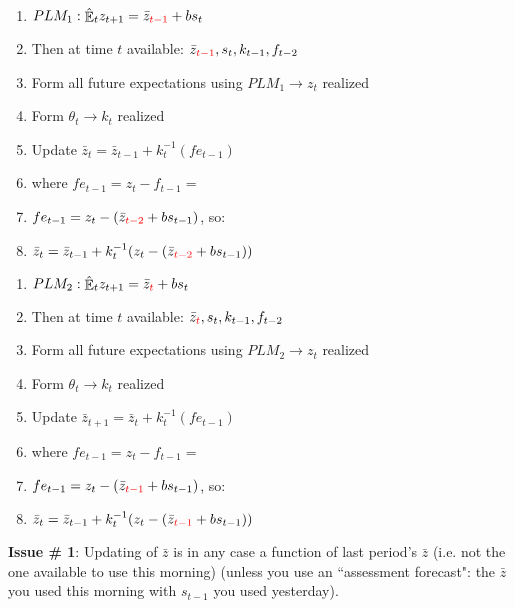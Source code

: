 \documentclass[11pt]{article}
\renewcommand{\[}{\begin{equation}}
\renewcommand{\]}{\end{equation}}
\DeclareMathOperator{\E}{\mathbb{E}}
\begin{document}
\begin{multicols}{2}

\begin{enumerate}
\item[] $PLM_1: \hat{\E}_t z_{t+1} = \bar{z}_{\color{red}{t-1}} + bs_t$
\item[] Then at time $t$ available: $\bar{z}_{\color{red}{t-1}}, s_t, k_{t-1}, f_{t-2}$
\item Form all future expectations using $PLM_1 \rightarrow z_t$ realized 
\item Form $\theta_t \rightarrow k_t$ realized
\item Update $\bar{z}_t = \bar{z}_{t-1} + k_t^{-1}(fe_{t-1})$
\item[] where $fe_{t-1} = z_{t}-f_{t-1} = $ 
\item[] $fe_{t-1} = z_{t}-(\bar{z}_{\color{red}{t-2}} + bs_{t-1})$, so:
\item[] $\bar{z}_t = \bar{z}_{t-1} + k_t^{-1}(z_{t}-(\bar{z}_{\color{red}{t-2}} + bs_{t-1}))$
\end{enumerate}

\columnbreak
\begin{enumerate}
\item[] $PLM_2: \hat{\E}_t z_{t+1} = \bar{z}_{\color{red}{t}} + bs_t$
\item[] Then at time $t$ available: $\bar{z}_{\color{red}{t}}, s_t, k_{t-1}, f_{t-2}$
\item Form all future expectations using $PLM_2 \rightarrow z_t$ realized
\item Form $\theta_t \rightarrow k_t$ realized
\item Update $\bar{z}_{t+1} = \bar{z}_{t} + k_t^{-1}(fe_{t-1})$
\item[] where $fe_{t-1} = z_{t}-f_{t-1} = $ 
\item[] $fe_{t-1} = z_{t}-(\bar{z}_{\color{red}{t-1}} + bs_{t-1})$, so:
\item[] $\bar{z}_t = \bar{z}_{t-1} + k_t^{-1}(z_{t}-(\bar{z}_{\color{red}{t-1}} + bs_{t-1}))$
\end{enumerate}
\end{multicols}
\textbf{Issue \# 1}: Updating of $\bar{z}$ is in any case a function of last period's $\bar{z}$ (i.e. not the one available to use this morning) (unless you use an ``assessment forecast": the $\bar{z}$ you used this morning with $s_{t-1}$ you used yesterday).
\end{document}
